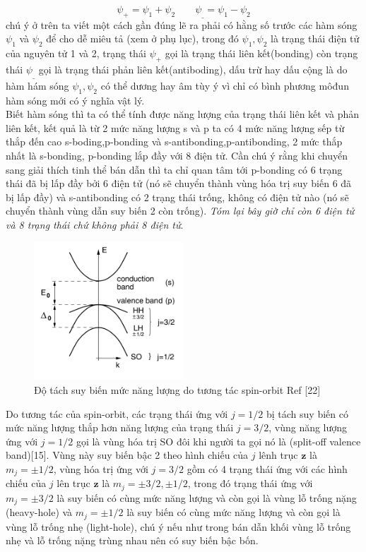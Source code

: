   \begin{equation}
  \psi_+=\psi_1 +\psi_2  \qquad \psi_\_=\psi_1 -\psi_2
  \end{equation}
  chú ý ở trên ta viết một cách gần đúng lẽ ra phải có hằng số trước các hàm sóng $\psi_1$ và $\psi_2$ để cho dễ miêu tả (xem ở phụ lục), trong  đó $\psi_1,\psi_2$ là trạng thái điện tử của nguyên tử 1 và 2, trạng thái $\psi_+$ gọi là trạng thái liên kết(bonding) còn trạng thái $\psi_\_$ gọi là trạng thái phản liên kết(antiboding), dấu trừ hay dấu cộng là do hàm hám sóng $\psi_1,\psi_2$ có thể dương hay âm tùy ý vì chỉ có bình phương môđun hàm sóng mới có ý nghĩa vật lý.\\
  Biết hàm sóng thì ta có thể tính được năng lượng của trạng thái liên kết và phản liên kết, kết quả là từ 2 mức năng lượng s và p ta có 4 mức năng lượng sếp từ thắp đến cao s-boding,p-bonding và s-antibonding,p-antibonding, 2 mức thắp nhất là s-bonding, p-bonding lắp đầy với 8 điện tử. Cần chú ý rằng khi chuyển sang giải thích tinh thể bán dẫn thì ta chỉ quan tâm tới p-bonding có 6 trạng thái đã bị lấp đầy bởi 6 điện tử (nó sẽ chuyển thành vùng hóa trị suy biến 6 đã bị lấp đầy) và s-antibonding có 2 trạng thái trống, không có điện tử nào (nó sẽ chuyển thành vùng dẫn suy biến 2 còn trống). \emph{Tóm lại bây giờ chỉ còn 6 điện tử và 8 trạng thái chứ không phải 8 điện tử}.\\
  \begin{figure}[hc]
  \centering
  \includegraphics[width=0.50\textwidth]{./Figures/band1.png}
  \caption[band structure]{Độ tách suy biến mức năng lượng do tương tác spin-orbit Ref [22]}
  \label{fig:band structure}
  \end{figure}
  Do tương tác của spin-orbit, các trạng thái ứng với $j=1/2$ bị tách suy biến có mức năng lượng thắp hơn năng lượng của trạng thái $j=3/2$, vùng năng lượng ứng với $j=1/2$ gọi là vùng hóa trị SO đôi khi người ta gọi nó là (split-off valence band)[15]. Vùng này suy biến bậc 2 theo hình chiếu của $j$ lênh trục $\mathbf{z}$ là $m_j=\pm 1/2$, vùng hóa trị ứng với $j=3/2$ gồm có 4 trạng thái ứng với các hình chiếu của $j$ lên trục $\mathbf{z}$ là $ m_j=\pm 3/2,\pm 1/2$, trong đó trạng thái ứng với $m_j=\pm 3/2$ là suy biến có cùng mức năng lượng và còn gọi là vùng lỗ trống nặng (heavy-hole) và $m_j = \pm 1/2$ là suy biến có cùng mức năng lượng và còn gọi là vùng lỗ trống nhẹ (light-hole), chú ý nếu như trong bán dẫn khối vùng lỗ trống nhẹ và lỗ trống nặng trùng nhau nên có suy biến bậc bốn.
